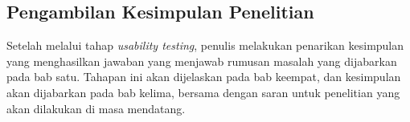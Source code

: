 	\subsection{Pengambilan Kesimpulan Penelitian}
	
	Setelah melalui tahap \textit{usability testing}, penulis melakukan penarikan kesimpulan yang menghasilkan jawaban yang menjawab rumusan masalah yang dijabarkan pada bab satu. Tahapan ini akan dijelaskan pada bab keempat, dan kesimpulan akan dijabarkan pada bab kelima, bersama dengan saran untuk penelitian yang akan dilakukan di masa mendatang.
	

